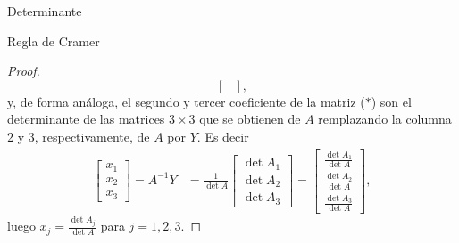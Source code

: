 \begin{chapter}{Determinante}
\begin{section}{Regla de Cramer}
\begin{proof}
$$\begin{bmatrix}
            \end{bmatrix},
        $$
        y,  de forma análoga, el segundo y tercer coeficiente de la matriz ($*$) son el determinante de las matrices $3 \times 3$ que se obtienen de $A$ remplazando la columna $2$ y $3$, respectivamente, de
        $A$ por $Y$. Es decir
        \begin{align*}
            \begin{bmatrix} x_1 \\
                x_2 \\
                x_3\end{bmatrix} = A^{-1}Y & = \frac{1}{\det A}\begin{bmatrix} \det A_1 \\
                                                               \det A_2 \\
                                                               \det A_3\end{bmatrix} = \begin{bmatrix} \frac{\det A_1}{\det A} \\
                                                                                       \frac{\det A_2}{\det A} \\
                                                                                       \frac{\det A_3}{\det A}\end{bmatrix},
        \end{align*}
        luego $x_j = \displaystyle\frac{\det A_j}{\det A}$ para $j =1,2,3$.
    \end{proof}


\end{section}
\end{chapter}
